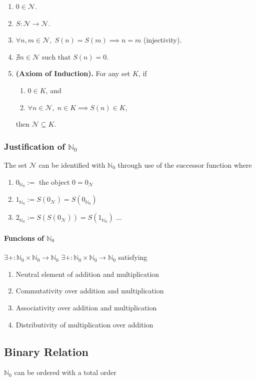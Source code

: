 \documentclass[twocolumn]{book}
\begin{document}
\begin{enumerate}
    \item $0 \in \mathcal{N}$.
    \item $S:\mathcal{N} \to \mathcal{N}$.
    \item $\forall n,m\in\mathcal{N},\; S(n)=S(m)\implies n=m$ \quad (injectivity).
    \item $\nexists n\in\mathcal{N} \text{ such that } S(n)=0$.
    \item \textbf{(Axiom of Induction).}  
    For any set $K$, if 
    \begin{enumerate}
        \item $0\in K$, and
        \item $\forall n\in\mathcal{N},\; n\in K\implies S(n)\in K$,
    \end{enumerate}
    then $\mathcal{N}\subseteq K$.
\end{enumerate}

\subsubsection{Justification of $\mathbb{N}_0$}
The set $\mathcal{N}$ can be identified with $\mathbb{N}_0$ through use of the successor function where
\begin{enumerate}
    \item $0_{\mathbb{N}_0} :=$ the object $0 = 0_\mathcal{N}$ 
    \item $1_{\mathbb{N}_0} := S(0_\mathcal{N}) = S(0_{\mathbb{N}_0})$
    \item $2_{\mathbb{N}_0} := S(S(0_\mathcal{N})) = S(1_{\mathbb{N}_0})$
        ...
\end{enumerate}
\paragraph{Funcions of $\mathbb{N}_0$}

$\exists +: \mathbb{N}_0 \times \mathbb{N}_0 \rightarrow \mathbb{N}_0$
$\exists +: \mathbb{N}_0 \times \mathbb{N}_0 \rightarrow \mathbb{N}_0$ 
satisfying

\begin{enumerate}
    \item Neutral element of addition and multiplication
    \item Commutativity over addition and multiplication
    \item Associativity over addition and multiplication
    \item Distributivity of multiplication over addition

\end{enumerate}
\subsection{Binary Relation}
$\mathbb{N}_0$ can be ordered with a total order
\end{document}
